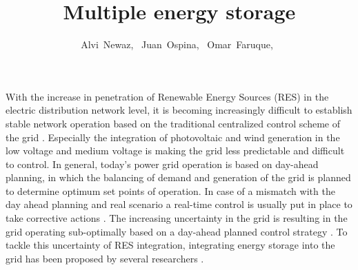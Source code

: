 \documentclass[journal,12pt,onecolumn]{IEEEtran}
\begin{document}
\title{Multiple energy storage}

\author{ Alvi~Newaz,~
Juan~Ospina,~
     Omar~Faruque,~
        }%





\maketitle                                                               
\IEEEpeerreviewmaketitle
With the increase in penetration of Renewable Energy Sources (RES) in the electric distribution network level, it is becoming increasingly difficult to establish stable network operation based on the traditional centralized control scheme of the grid \cite{WHY}. Especially the integration of photovoltaic and wind generation in the low voltage and medium voltage is making the grid less predictable and difficult to control. In general, today's power grid operation is based on day-ahead planning, in which the balancing of demand and generation of the grid is planned to determine optimum set points of operation. In case of a mismatch with the day ahead planning and real scenario a real-time control is usually put in place to take corrective actions \cite{WHY2}. The increasing uncertainty in the grid is resulting in the grid operating sub-optimally based on a day-ahead planned control strategy \cite{WHY2}. To tackle this uncertainty of RES integration, integrating energy storage into the grid has been proposed by several researchers \cite{WHY2,ESI1,ES2,ES3}. 
\end{document}
